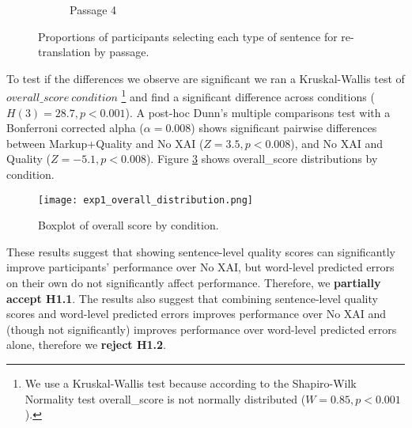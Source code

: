 \begin{figure}[h!]
\begin{subfigure}[t]{0.45\textwidth}
{\begin{bchart}[step=.25,max=1,width=\linewidth]
        \bcskip{6pt}
        
        \bcskip{6pt}
        
        
        \end{bchart}}
        \caption{Passage 4} 
        \label{fig:exp1_p4_prop_answers}
    \end{subfigure}
    
    \caption{Proportions of participants selecting each type of sentence for re-translation by passage.}
    \label{fig:exp1_prop_answers}

\end{figure}

To test if the differences we observe are significant we ran a Kruskal-Wallis test of $overall\_score ~ condition$ \footnote{We use a Kruskal-Wallis test because according to the Shapiro-Wilk Normality test overall\_score is not normally distributed ($W = 0.85, p < 0.001$).} and find a significant difference across conditions ($H(3) = 28.7, p < 0.001$). A post-hoc Dunn’s multiple comparisons test with a Bonferroni corrected alpha ($\alpha = 0.008$) shows significant pairwise differences between Markup+Quality and No XAI ($Z = 3.5, p < 0.008$), and No XAI and Quality ($Z = -5.1, p < 0.008$). Figure \ref{fig:exp1_overall_distribution} shows overall\_score distributions by condition. 

\begin{figure}[h!]
    \centering
    \texttt{[image: exp1\_overall\_distribution.png]}
    \caption{Boxplot of overall score by condition.}
    \label{fig:exp1_overall_distribution}
\end{figure}

These results suggest that showing sentence-level quality scores can significantly improve participants’ performance over No XAI, but word-level predicted errors on their own do not significantly affect performance. Therefore, we \textbf{partially accept H1.1}. The results also suggest that combining sentence-level quality scores and word-level predicted errors improves performance over No XAI and (though not significantly) improves performance over word-level predicted errors alone, therefore we \textbf{reject H1.2}.

